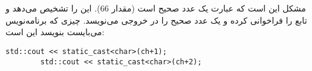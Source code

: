 \section{}
\paragraph{}\label{answer:45}
مشکل این است که عبارت  یک عدد صحیح است (مقدار 66).  این را تشخیص می‌دهد و تابع  را فراخوانی کرده و یک عدد صحیح را در خروجی می‌نویسد. چیزی که برنامه‌نویس می‌بایست بنویسد این است:
\begin{LTR}
    \begin{lstlisting}[style=C++Style]
        std::cout << static_cast<char>(ch+1);
        std::cout << static_cast<char>(ch+2);
    \end{lstlisting}
\end{LTR}
